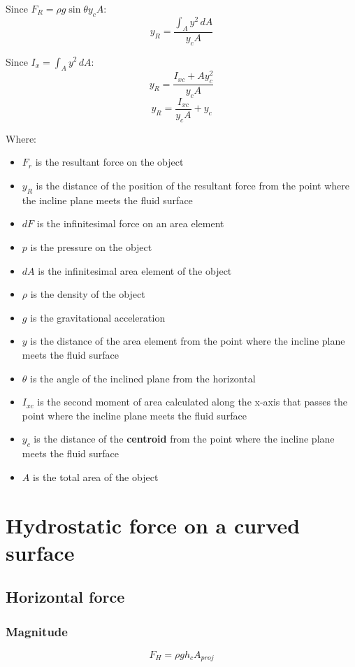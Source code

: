 \documentclass[11pt]{article}
\begin{document}
Since \(F_R = \rho g \sin \theta y_c A\):
\[y_R = \frac{\int_A y^2 \, dA}{y_c A}\]

Since \(I_x = \int_A y^2 \, dA\):
\[y_R = \frac{I_{xc} + Ay_c^2}{y_c A}\]
\[y_R = \frac{I_{xc}}{y_c A} + y_c\]

Where:
\begin{itemize}
\item \(F_r\) is the resultant force on the object
\item \(y_R\) is the distance of the position of the resultant force from the point where the incline plane meets the fluid surface
\item \(dF\) is the infinitesimal force on an area element
\item \(p\) is the pressure on the object
\item \(dA\) is the infinitesimal area element of the object
\item \(\rho\) is the density of the object
\item \(g\) is the gravitational acceleration
\item \(y\) is the distance of the area element from the point where the incline plane meets the fluid surface
\item \(\theta\) is the angle of the inclined plane from the horizontal
\item \(I_{xc}\) is the second moment of area calculated along the x-axis that passes the point where the incline plane meets the fluid surface
\item \(y_c\) is the distance of the \textbf{centroid} from the point where the incline plane meets the fluid surface
\item \(A\) is the total area of the object
\end{itemize}


\section{Hydrostatic force on a curved surface}
\label{sec:org9f980f0}

\subsection{Horizontal force}
\label{sec:orgbc695c8}

\subsubsection{Magnitude}
\label{sec:org97e4a1e}
\[F_H = \rho g h_c A_{proj}\]
\end{document}
